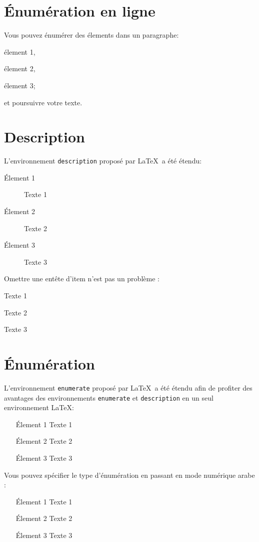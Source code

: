 \documentclass[french]{spimubephdthesis}
\begin{document}
\section{\'Enumération en ligne}

Vous pouvez énumérer des élements dans un paragraphe: \begin{inlineenumeration}
\item élement 1,
\item élement 2,
\item élement 3;
\end{inlineenumeration} et poursuivre votre texte.

\section{Description}

L'environnement \texttt{description} proposé par \LaTeX\ a été étendu:
\begin{description}
\item[\'Element 1] Texte 1
\item[\'Element 2] Texte 2
\item[\'Element 3] Texte 3
\end{description}

Omettre une entête d'item n'est pas un problème :
\begin{description}
\item[\'Element 1] Texte 1
\item Texte 2
\item[\'Element 3] Texte 3
\end{description}

\section{\'Enumération}

L'environnement \texttt{enumerate} proposé par \LaTeX\ a été étendu afin de profiter des avantages des environnements \texttt{enumerate} et \texttt{description} en un seul environnement \LaTeX:
\begin{enumerate}
\item[\'Element 1] Texte 1
\item[\'Element 2] Texte 2
\item[\'Element 3] Texte 3
\end{enumerate}

Vous pouvez spécifier le type d'énumération en passant en mode numérique arabe :
\begin{enumerate}[1]
\item[\'Element 1] Texte 1
\item[\'Element 2] Texte 2
\item[\'Element 3] Texte 3
\end{enumerate}
\end{document}
